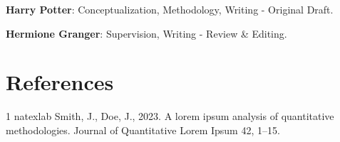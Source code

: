 \documentclass[
  authoryear,
  preprint,
  3p]{elsarticle}
\begin{document}
\textbf{Harry Potter}: Conceptualization, Methodology, Writing - Original Draft.

\textbf{Hermione Granger}: Supervision, Writing - Review \& Editing.

\clearpage

\section{References}\label{references}

\renewcommand{\bibsection}{}
\begin{thebibliography}{1}
\expandafter\ifx\csname natexlab\endcsname\relax\def\natexlab#1{#1}\fi
\providecommand{\url}[1]{\texttt{#1}}
\providecommand{\href}[2]{#2}
\providecommand{\path}[1]{#1}
\providecommand{\DOIprefix}{doi:}
\providecommand{\ArXivprefix}{arXiv:}
\providecommand{\URLprefix}{URL: }
\providecommand{\Pubmedprefix}{pmid:}
\providecommand{\doi}[1]{\href{http://dx.doi.org/#1}{\path{#1}}}
\providecommand{\Pubmed}[1]{\href{pmid:#1}{\path{#1}}}
\providecommand{\bibinfo}[2]{#2}
\ifx\xfnm\relax \def\xfnm[#1]{\unskip,\space#1}\fi
\bibinfo{author}{Smith, J.}, \bibinfo{author}{Doe, J.}, \bibinfo{year}{2023}.
\newblock \bibinfo{title}{A lorem ipsum analysis of quantitative methodologies}.
\newblock \bibinfo{journal}{Journal of Quantitative Lorem Ipsum} \bibinfo{volume}{42}, \bibinfo{pages}{1--15}.

\end{thebibliography}
\end{document}
